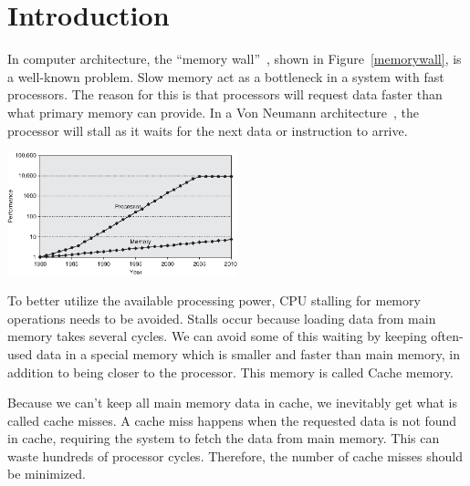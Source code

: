 \section{Introduction} %


In computer architecture, the ``memory wall''~\cite{wulf_mckee_1995},
shown in Figure~\ref{memorywall}, is a well-known problem. Slow memory
act as a bottleneck in a system with fast processors. The reason for
this is that processors will request data faster than what primary
memory can provide. In a Von Neumann architecture~\cite{von1993first},
the processor will stall as it waits for the next data or instruction
to arrive.

\begin{center}
  \includegraphics[width=0.5\textwidth]{graphs/memorywall}
  \label{memorywall}
\end{center}

To better utilize the available processing power, CPU stalling for
memory operations needs to be avoided. Stalls occur because loading
data from main memory takes several cycles. We can avoid some of this
waiting by keeping often-used data in a special memory which is
smaller and faster than main memory, in addition to being closer to
the processor. This memory is called Cache memory.

Because we can't keep all main memory data in cache, we inevitably get
what is called cache misses. A cache miss happens when the requested
data is not found in cache, requiring the system to fetch the data
from main memory. This can waste hundreds of processor cycles. Therefore, the
number of cache misses should be minimized.



